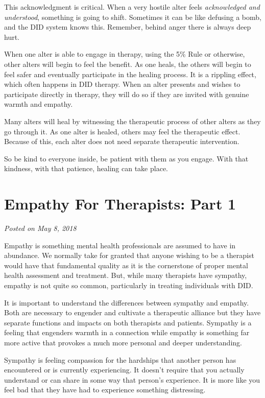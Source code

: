 \documentclass[]{book}
\begin{document}
This acknowledgment is critical. When a very hostile alter feels \emph{acknowledged and understood}, something is going to shift. Sometimes it can be like defusing a bomb, and the DID system knows this. Remember, behind anger there is always deep hurt.

When one alter is able to engage in therapy, using the 5\% Rule or otherwise, other alters will begin to feel the benefit. As one heals, the others will begin to feel safer and eventually participate in the healing process. It is a rippling effect, which often happens in DID therapy. When an alter presents and wishes to participate directly in therapy, they will do so if they are invited with genuine warmth and empathy.

Many alters will heal by witnessing the therapeutic process of other alters as they go through it. As one alter is healed, others may feel the therapeutic effect. Because of this, each alter does not need separate therapeutic intervention.

So be kind to everyone inside, be patient with them as you engage. With that kindness, with that patience, healing can take place.

\hypertarget{empathy-for-therapists-part-1}{%
\section{Empathy For Therapists: Part 1}\label{empathy-for-therapists-part-1}}

\emph{Posted on May 8, 2018}

Empathy is something mental health professionals are assumed to have in abundance. We normally take for granted that anyone wishing to be a therapist would have that fundamental quality as it is the cornerstone of proper mental health assessment and treatment. But, while many therapists have sympathy, empathy is not quite so common, particularly in treating individuals with DID.

It is important to understand the differences between sympathy and empathy. Both are necessary to engender and cultivate a therapeutic alliance but they have separate functions and impacts on both therapists and patients. Sympathy is a feeling that engenders warmth in a connection while empathy is something far more active that provokes a much more personal and deeper understanding.

Sympathy is feeling compassion for the hardships that another person has encountered or is currently experiencing. It doesn't require that you actually understand or can share in some way that person's experience. It is more like you feel bad that they have had to experience something distressing.
\end{document}
